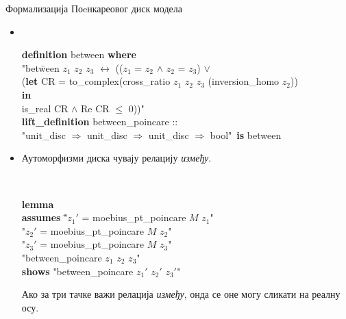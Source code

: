 \documentclass[slidestop, compress, mathserif, containsverbatim, xcolor=dvipsnames]{beamer}
\begin{document}
\begin{frame}[shrink]{Формализација Поeнкареовог диск модела}
  \begin{itemize}
  \item {}
    \begin{footnotesize} {\tt
        \begin{tabbing}
          {\bf def}\={\bf inition} between {\bf where} \\
          \> "{}bet\=ween $z_1$ $z_2$ $z_3$ $\longleftrightarrow$ (($z_1$ = $z_2$ $\land$ $z_2$ = $z_3$) $\lor$ \\
      \> \> (\= {\bf let} CR = to\_complex(cross\_ratio $z_1$ $z_2$ $z_3$ (inversion\_homo $z_2$)) \\
      \>\>\> {\bf in} \\
      \>\>\> is\_real CR $\land$ Re CR $\le$ $0$))" \\

        {\bf lift\_definition} between\_poincare :: \\
        \> "{}unit\_disc $\Rightarrow$ unit\_disc $\Rightarrow$ unit\_disc $\Rightarrow$ bool"\ {\bf is} between
        \end{tabbing}
    } \end{footnotesize} 
  \item \begin{block}{} Аутоморфизми диска чувају релацију
    \emph{између}.
  \end{block}
    \begin{footnotesize} {\tt
        \begin{tabbing}
          {\bf lem}\={\bf ma} \\
          \> {\bf assumes} \= "$z_1'$ = moebius\_pt\_poincare $M$ $z_1$" \\
          \> \> "$z_2'$ = moebius\_pt\_poincare $M$ $z_2$" \\
          \> \> "$z_3'$ = moebius\_pt\_poincare $M$ $z_3$" \\
          \> \> "between\_poincare $z_1$ $z_2$ $z_3$" \\
          \> {\bf shows} "between\_poincare $z_1'$ $z_2'$ $z_3'$"
        \end{tabbing}
    } \end{footnotesize}

   \begin{block}{}
     Ако за три тачке важи релација \emph{између}, онда се оне могу
     сликати на реалну осу.
   \end{block}
  \end{itemize}
\end{frame}
\end{document}

